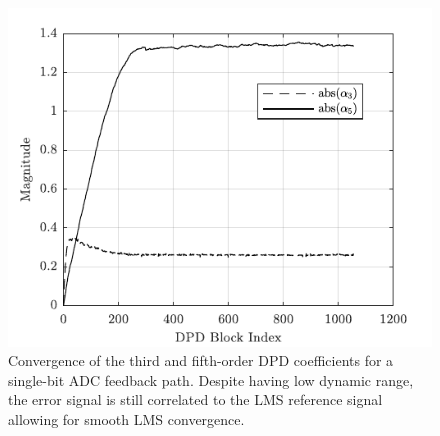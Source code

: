\documentclass[conference]{IEEEtran}
\begin{document}
\begin{figure}[]
	\centering
	\includegraphics{SubBandCon}
	\caption{Convergence of the third and fifth-order DPD coefficients for a single-bit ADC feedback path. Despite having low dynamic range, the error signal is still correlated to the LMS reference signal allowing for smooth LMS convergence.}
	\label{subbandcon}
\end{figure}



%
%
\end{document}
